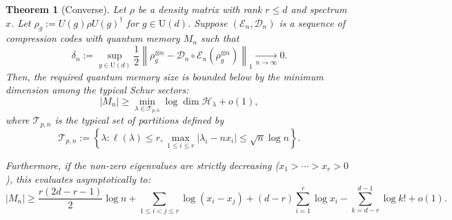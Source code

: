 \documentclass[a4paper,onecolumn,11pt]{quantumarticle}
\newtheorem{thm}{Theorem}
\def\h{\mathcal{H}}
\begin{document}
\begin{thm}[Converse]\label{thm:converse}
Let $\rho$ be a density matrix with rank $r\le d$ and spectrum $x$. Let $\rho_g:= U(g)\rho U(g)^\dagger$ for $g\in \mathrm U(d)$.
Suppose $(\mathcal E_n,\mathcal D_n)$ is a sequence of compression codes with quantum memory $M_n$ such that
\begin{equation}
    \delta_n:= 
    \sup_{g\in \mathrm U(d)}
    \frac12\left\|
        \rho_g^{\otimes n}
        -
        \mathcal D_n\circ \mathcal E_n(\rho_g^{\otimes n})
    \right\|_1
    \xrightarrow[n\to\infty]{}0 .
\end{equation}
Then, the required quantum memory size is bounded below by the minimum dimension among the typical Schur sectors:
\begin{equation}
    |M_n| \ge \min_{\lambda \in \mathcal T_{p,n}} \log \dim \h_{\lambda} + o(1),
\end{equation}
where $\mathcal T_{p,n}$ is the typical set of partitions defined by
\begin{equation}
    \mathcal T_{p,n}:= \left\{ \lambda : \ell(\lambda)\le r, \max_{1\le i\le r} |\lambda_i-nx_i| \le \sqrt{n}\log n \right\}.
\end{equation}

Furthermore, if the non-zero eigenvalues are strictly decreasing ($x_1>\cdots>x_r>0$), this evaluates asymptotically to:
\begin{equation}
    |M_n|
    \ge
    \frac{r(2d-r-1)}{2}\log n
    + \sum_{1\le i<j\le r}\log (x_i-x_j)
    + (d-r)\sum_{i=1}^r \log x_i
    - \sum_{k=d-r}^{d-1}\log k!
    + o(1).
\end{equation}
\end{thm}
\end{document}
